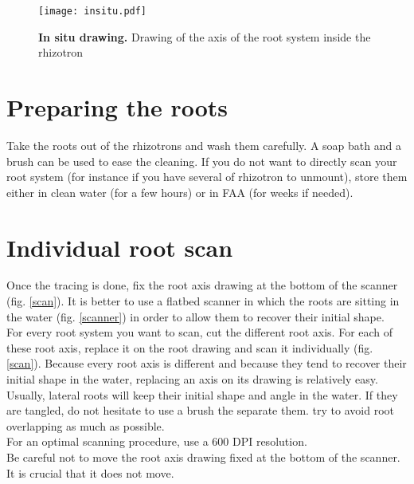 \documentclass[a4paper,english,10pt]{report}
\begin{document}
\begin{figure}[htbp]
\begin{center}
\texttt{[image: insitu.pdf]}
\caption[In situ drawing]{\textbf{In situ drawing.} Drawing of the axis of the root system inside the rhizotron}
\label{insitu}
\end{center}
\end{figure}


\section{Preparing the roots}

Take the roots out of the rhizotrons and wash them carefully. A soap bath and a brush can be used to ease the cleaning. If you do not want to directly scan your root system (for instance if you have several of rhizotron to unmount), store them either in clean water (for a few hours) or in FAA (for weeks if needed).\\


\section{Individual root scan}

Once the tracing is done, fix the root axis drawing at the bottom of the scanner (fig. \ref{scan}). It is better to use a flatbed scanner in which the roots are sitting in the water (fig. \ref{scanner}) in order to allow them to recover their initial shape.\\

For every root system you want to scan, cut the different root axis. For each of these root axis, replace it on the root drawing and scan it individually (fig. \ref{scan}). Because every root axis is different and because they tend to recover their initial shape in the water, replacing an axis on its drawing is relatively easy. Usually, lateral roots will keep their initial shape and angle in the water. If they are tangled, do not hesitate to use a brush the separate them. try to avoid root overlapping as much as possible.\\

For an optimal scanning procedure, use a 600 DPI resolution.\\

Be careful not to move the root axis drawing fixed at the bottom of the scanner. It is crucial that it does not move.\\
\end{document}
